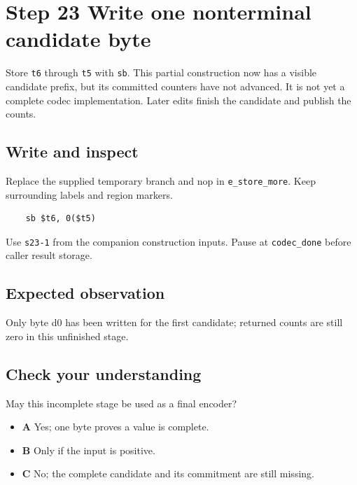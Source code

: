\section{Step 23 Write one nonterminal candidate byte}\label{delta-s23}

Store \texttt{t6} through \texttt{t5} with \texttt{sb}. This partial construction now has a visible candidate prefix, but its committed counters have not advanced. It is not yet a complete codec implementation. Later edits finish the candidate and publish the counts.

\subsection{Write and inspect}
Replace the supplied temporary branch and nop in \texttt{e\_store\_more}. Keep surrounding labels and region markers.

\begin{verbatim}
    sb $t6, 0($t5)
\end{verbatim}
Use \texttt{s23-1} from the companion construction inputs. Pause at \texttt{codec\_done} before caller result storage.

\subsection{Expected observation}
Only byte d0 has been written for the first candidate; returned counts are still zero in this unfinished stage.

\subsection{Check your understanding}
May this incomplete stage be used as a final encoder?

\begin{itemize}
  \item \textbf{A} Yes; one byte proves a value is complete.
  \item \textbf{B} Only if the input is positive.
  \item \textbf{C} No; the complete candidate and its commitment are still missing.
\end{itemize}
